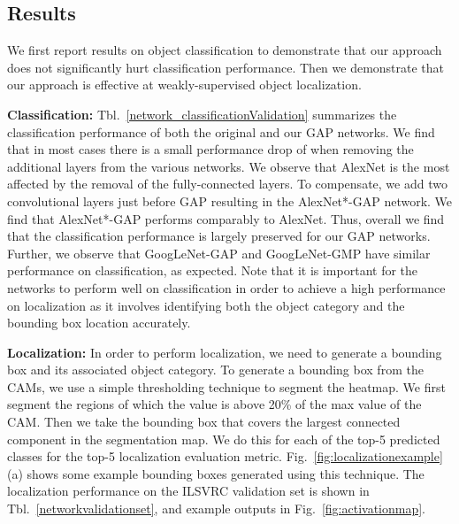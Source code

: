 \documentclass[10pt,twocolumn,letterpaper]{article}
\begin{document}
\subsection{Results}
\label{sec:locresults}
We first report results on object classification to demonstrate that our approach does not significantly hurt classification performance. Then we demonstrate that our approach is effective at weakly-supervised object localization.

\textbf{Classification:} Tbl.~\ref{network_classificationValidation} summarizes the classification performance of both the original and our GAP networks. We find that in most cases there is a small performance drop of  when removing the additional layers from the various networks. We observe that AlexNet is the most affected by the removal of the fully-connected layers. To compensate, we add two convolutional layers just before GAP resulting in the AlexNet*-GAP network. We find that AlexNet*-GAP performs comparably to AlexNet. Thus, overall we find that the classification performance is largely preserved for our GAP networks. Further, we observe that GoogLeNet-GAP and GoogLeNet-GMP have similar performance on classification, as expected. Note that it is important for the networks to perform well on classification in order to achieve a high performance on localization as it involves identifying both the object category and the bounding box location accurately.

\textbf{Localization:} In order to perform localization, we need to generate a bounding box and its associated object category. To generate a bounding box from the CAMs, we use a simple thresholding technique to segment the heatmap. We first segment the regions of which the value is above 20\% of the max value of the CAM. Then we take the bounding box that covers the largest connected component in the segmentation map. We do this for each of the top-5 predicted classes for the top-5 localization evaluation metric. Fig.~\ref{fig:localizationexample}(a) shows some example bounding boxes generated using this technique. The localization performance on the ILSVRC validation set is shown in Tbl.~\ref{networkvalidationset}, and example outputs in Fig.~\ref{fig:activationmap}.
\end{document}
